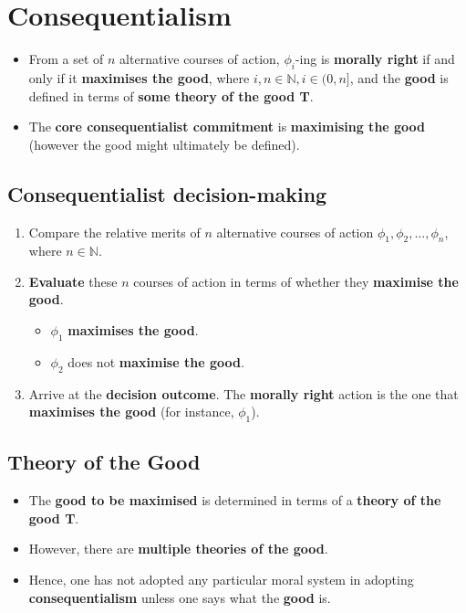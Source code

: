 \documentclass[11pt]{article}
\begin{document}
 \newpage
\section{Consequentialism}
\label{sec:org250841f}
\begin{itemize}
\item From a set of \(n\) alternative courses of action, \(\phi_i\)-ing is \textbf{morally right} if and only if it \textbf{maximises the good}, where \(i, n \in \mathbb{N}, i \in (0, n]\), and the \textbf{good} is defined in terms of \textbf{some theory of the good T}.
\item The \textbf{core consequentialist commitment} is \textbf{maximising the good} (however the good might ultimately be defined).
\end{itemize}
\subsection{Consequentialist decision-making}
\label{sec:org1b7eb7a}
\begin{enumerate}
\item Compare the relative merits of \(n\) alternative courses of action \(\phi_1, \phi_2, \ldots, \phi_n\), where \(n \in \mathbb{N}\).
\item \textbf{Evaluate} these \(n\) courses of action in terms of whether they \textbf{maximise the good}.
\begin{itemize}
\item \(\phi_1\) \textbf{maximises the good}.
\item \(\phi_2\) does not \textbf{maximise the good}.
\end{itemize}
\item Arrive at the \textbf{decision outcome}. The \textbf{morally right} action is the one that \textbf{maximises the good} (for instance, \(\phi_1\)).
\end{enumerate}

 \newpage
\subsection{Theory of the Good}
\label{sec:orgf715a40}
\begin{itemize}
\item The \textbf{good to be maximised} is determined in terms of a \textbf{theory of the good T}.
\item However, there are \textbf{multiple theories of the good}.
\item Hence, one has not adopted any particular moral system in adopting \textbf{consequentialism} unless one says what the \textbf{good} is.
\end{itemize}
\end{document}
